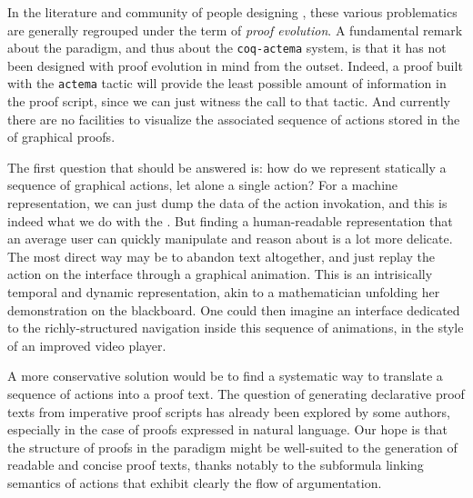 In the literature and community of people designing , these
various problematics are generally regrouped under the term of \emph{proof
evolution}. A fundamental remark about the  paradigm, and thus
about the \texttt{coq-actema} system, is that it has not been designed with
proof evolution in mind from the outset. Indeed, a proof built with the
\texttt{actema} tactic will provide the least possible amount of information in
the proof script, since we can just witness the call to that tactic. And
currently there are no facilities to visualize the associated sequence of
actions stored in the  of graphical proofs.

The first question that should be answered is: how do we represent statically a
sequence of graphical actions, let alone a single action? For a machine
representation, we can just dump the data of the action invokation, and this is
indeed what we do with the . But finding a human-readable
representation that an average user can quickly manipulate and reason about is a
lot more delicate. The most direct way may be to abandon text altogether, and
just replay the action on the interface through a graphical animation. This is
an intrisically temporal and dynamic representation, akin to a mathematician
unfolding her demonstration on the blackboard. One could then imagine an
interface dedicated to the richly-structured navigation inside this sequence of
animations, in the style of an improved video player.

A more conservative solution would be to find a systematic way to translate a
sequence of actions into a proof text. The question of generating declarative
proof texts from imperative proof scripts has already been explored by some
authors, especially in the case of proofs expressed in natural
language. Our hope is that the structure of proofs
in the  paradigm might be well-suited to the generation of
readable and concise proof texts, thanks notably to the subformula linking
semantics of  actions that exhibit clearly the flow of argumentation.

